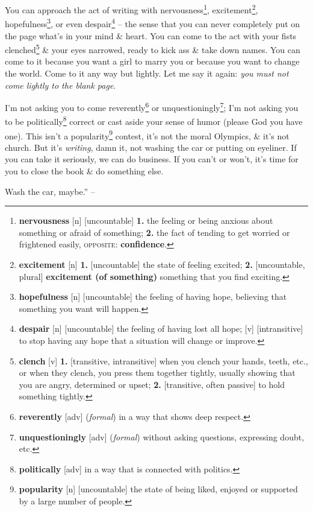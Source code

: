 \documentclass[oneside]{book}
\numberwithin{equation}{section}
\begin{document}
You can approach the act of writing with nervousness\footnote{\textbf{nervousness} [n] [uncountable] \textbf{1.} the feeling or being anxious about something or afraid of something; \textbf{2.} the fact of tending to get worried or frightened easily, \textsc{opposite}: \textbf{confidence}.}, excitement\footnote{\textbf{excitement} [n] \textbf{1.} [uncountable] the state of feeling excited; \textbf{2.} [uncountable, plural] \textbf{excitement (of something)} something that you find exciting.}, hopefulness\footnote{\textbf{hopefulness} [n] [uncountable] the feeling of having hope, believing that something you want will happen.}, or even despair\footnote{\textbf{despair} [n] [uncountable] the feeling of having lost all hope; [v] [intransitive] to stop having any hope that a situation will change or improve.} -- the sense that you can never completely put on the page what's in your mind \& heart. You can come to the act with your fists clenched\footnote{\textbf{clench} [v] \textbf{1.} [transitive, intransitive] when you clench your hands, teeth, etc., or when they clench, you press them together tightly, usually showing that you are angry, determined or upset; \textbf{2.} [transitive, often passive] to hold something tightly.} \& your eyes narrowed, ready to kick ass \& take down names. You can come to it because you want a girl to marry you or because you want to change the world. Come to it any way but lightly. Let me say it again: \textit{you must not come lightly to the blank page}.

I'm not asking you to come reverently\footnote{\textbf{reverently} [adv] (\textit{formal}) in a way that shows deep respect.} or unquestioningly\footnote{\textbf{unquestioningly} [adv] (\textit{formal}) without asking questions, expressing doubt, etc.}; I'm not asking you to be politically\footnote{\textbf{politically} [adv] in a way that is connected with politics.} correct or cast aside your sense of humor (please God you have one). This isn't a popularity\footnote{\textbf{popularity} [n] [uncountable] the state of being liked, enjoyed or supported by a large number of people.} contest, it's not the moral Olympics, \& it's not church. But it's \textit{writing}, damn it, not washing the car or putting on eyeliner. If you can take it seriously, we can do business. If you can't or won't, it's time for you to close the book \& do something else.

Wash the car, maybe.'' -- \cite[pp. 82--85]{King2010}

\end{document}
